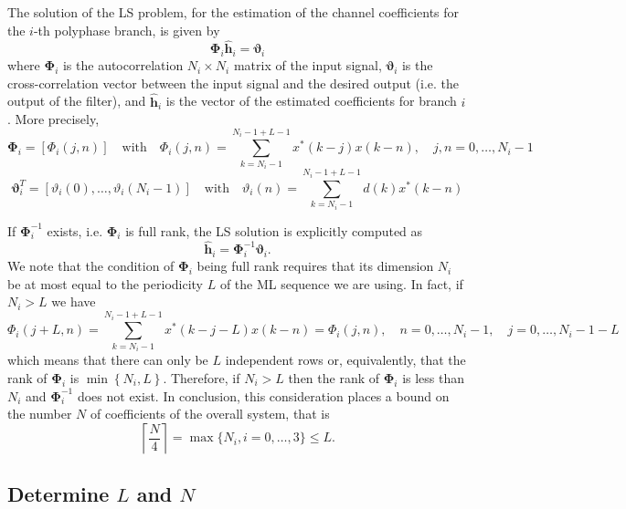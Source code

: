 \documentclass[10pt]{article}
\numberwithin{equation}{section}
\begin{document}
The solution of the LS problem, for the estimation of the channel coefficients for the $i$-th polyphase branch, is given by
\begin{equation}
	\mathbf{\Phi}_i \mathbf{\hat{h}}_i = \boldsymbol\vartheta_i
\end{equation}
where $\mathbf{\Phi}_i$ is the autocorrelation $N_i \times N_i$ matrix of the input signal, $ \boldsymbol\vartheta_i$ is the cross-correlation vector between the input signal and the desired output (i.e. the output of the filter), and $\mathbf{\hat{h}}_i$ is the vector of the estimated coefficients for branch $i$. More precisely,
\begin{equation}
	\mathbf{\Phi}_i = [\Phi_i(j,n)] \quad \mathrm{ with } \quad \Phi_i(j,n) = \sum_{k=N_i-1}^{N_i-1+L-1} x^*(k-j)x(k-n), \quad j,n=0,\ldots,N_i-1
\end{equation}
\begin{equation}
	\boldsymbol\vartheta_i ^T = [\vartheta_i(0),\ldots, \vartheta_i(N_i-1)] \quad \mathrm{ with } \quad \vartheta_i(n) = \sum_{k=N_i-1}^{N_i-1+L-1} d(k)x^*(k-n)
\end{equation}

If $\mathbf{\Phi}_i^{-1}$ exists, i.e. $\mathbf{\Phi}_i$ is full rank, the LS solution is explicitly computed as
\begin{equation}
	\mathbf{\hat{h}}_i = \mathbf{\Phi}_i^{-1} \boldsymbol\vartheta_i.
\end{equation}
We note that the condition of $\mathbf{\Phi}_i$ being full rank requires that its dimension $N_i$ be at most equal to the periodicity $L$ of the ML sequence we are using. In fact, if $N_i > L$ we have
\begin{equation}
	\Phi_i(j+L, n) = \sum_{k=N_i-1}^{N_i-1+L-1} x^*(k-j-L)x(k-n) = \Phi_i(j, n), \quad n=0,\ldots,N_i-1, \quad j = 0,\ldots,N_i-1-L
\end{equation}
which means that there can only be $L$ independent rows or, equivalently, that the rank of $\mathbf{\Phi}_i$ is $\min \left\lbrace N_i, L \right\rbrace$. Therefore, if $N_i > L$ then the rank of $\mathbf{\Phi}_i$ is less than $N_i$ and $\mathbf{\Phi}_i^{-1}$ does not exist. In conclusion, this consideration places a bound on the number $N$ of coefficients of the overall system, that is
\begin{equation}
	\left\lceil\frac{N}{4}\right\rceil = \max \{N_i, i=0,\ldots,3\} \leq L.
\end{equation}

\subsection*{Determine $L$ and $N$}
\end{document}
